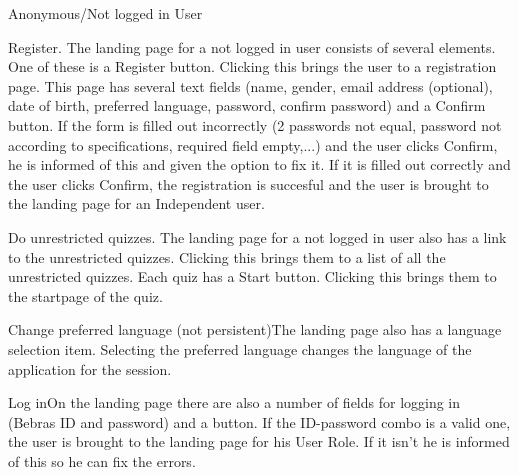 \begin{section}{Anonymous/Not logged in User}


    \begin{subsection}{Register.} The landing page for a not logged in user consists of several elements. One of these is a Register button. Clicking this brings the user to a registration page. This page has several text fields (name, gender, email address (optional), date of birth, preferred language, password, confirm password) and a Confirm button. If the form is filled out incorrectly (2 passwords not equal, password not according to specifications, required field empty,...) and the user clicks Confirm, he is informed of this and given the option to fix it. If it is filled out correctly and the user clicks Confirm, the registration is succesful and the user is brought to the landing page for an Independent user.\end{subsection}
	\begin{subsection}{Do unrestricted quizzes.} The landing page for a not logged in user also has a link to the unrestricted quizzes. Clicking this brings them to a list of all the unrestricted quizzes. Each quiz has a Start button. Clicking this brings them to the startpage of the quiz.\end{subsection}
    \begin{subsection}{Change preferred language (not persistent)}The landing page also has a language selection item. Selecting the preferred language changes the language of the application for the session.\end{subsection}
    \begin{subsection}{Log in}On the landing page there are also a number of fields for logging in (Bebras ID and password) and a button. If the ID-password combo is a valid one, the user is brought to the landing page for his User Role. If it isn't he is informed of this so he can fix the errors. \end{subsection}


\end{section}
